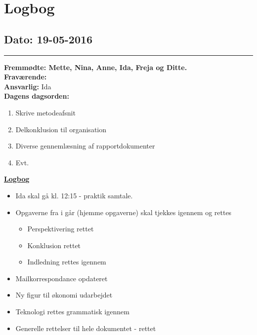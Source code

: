 \chapter{Logbog}
\section{Dato: 19-05-2016}
\hrule
\textbf{Fremmødte: Mette, Nina, Anne, Ida, Freja og Ditte.} \\
\textbf{Fraværende:} \\
\textbf{Ansvarlig:} Ida \\
\textbf{Dagens dagsorden: }
\begin{enumerate}
\item Skrive metodeafsnit
\item Delkonklusion til organisation
\item Diverse gennemlæsning af rapportdokumenter
\item Evt.
\end{enumerate}

\underline{\textbf{Logbog}}
\begin{itemize}
\item Ida skal gå kl. 12:15 - praktik samtale.
\item Opgaverne fra i går (hjemme opgaverne) skal tjekkes igennem og rettes
\begin{itemize}
\item Perspektivering rettet
\item Konklusion rettet
\item Indledning rettes igennem
\end{itemize}
\item Mailkorrespondance opdateret
\item Ny figur til økonomi udarbejdet
\item Teknologi rettes grammatisk igennem
\item Generelle rettelser til hele dokumentet - rettet
\end{itemize}

\newpage